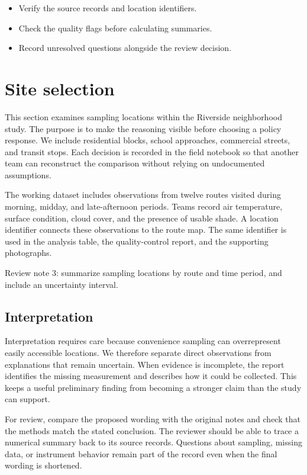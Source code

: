 \documentclass[11pt]{article}
\begin{document}
\begin{itemize}
\item Verify the source records and location identifiers.
\item Check the quality flags before calculating summaries.
\item Record unresolved questions alongside the review decision.
\end{itemize}

\section{Site selection}
This section examines sampling locations within the Riverside neighborhood study. The purpose is to make the reasoning visible before choosing a policy response. We include residential blocks, school approaches, commercial streets, and transit stops. Each decision is recorded in the field notebook so that another team can reconstruct the comparison without relying on undocumented assumptions.

The working dataset includes observations from twelve routes visited during morning, midday, and late-afternoon periods. Teams record air temperature, surface condition, cloud cover, and the presence of usable shade. A location identifier connects these observations to the route map. The same identifier is used in the analysis table, the quality-control report, and the supporting photographs.

Review note 3: summarize sampling locations by route and time period, and include an uncertainty interval.

\subsection{Interpretation}
Interpretation requires care because convenience sampling can overrepresent easily accessible locations. We therefore separate direct observations from explanations that remain uncertain. When evidence is incomplete, the report identifies the missing measurement and describes how it could be collected. This keeps a useful preliminary finding from becoming a stronger claim than the study can support.

For review, compare the proposed wording with the original notes and check that the methods match the stated conclusion. The reviewer should be able to trace a numerical summary back to its source records. Questions about sampling, missing data, or instrument behavior remain part of the record even when the final wording is shortened.
\end{document}
